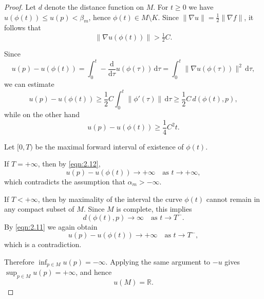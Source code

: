\documentclass[11pt]{amsart}
\theoremstyle{plain}
\theoremstyle{definition}
\theoremstyle{remark}
\numberwithin{equation}{section}
\begin{document}
\begin{proof}
    Let $d$ denote the distance function on $M$.
    For $t \geq 0$ we have $u(\phi(t)) \leq u(p) < \beta_m$, hence $\phi(t) \in M \setminus K$.
    Since $\|\nabla u\| = \frac{1}{2}\|\nabla f\|$, it follows that
    \begin{equation}
        \|\nabla u(\phi(t))\| > \tfrac{1}{2} C.
    \end{equation}

    Since
    \begin{equation}
        u(p) - u(\phi(t)) = \int_0^t -\frac{\mathrm{d}}{\mathrm{d}\tau} u(\phi(\tau)) \, \mathrm{d}\tau = \int_0^t \|\nabla u(\phi(\tau))\|^2 \, \mathrm{d}\tau,
    \end{equation}
    we can estimate
    \begin{equation}\label{eqn:2.11}
        u(p) - u(\phi(t)) \geq \frac{1}{2} C \int_0^t \|\phi'(\tau)\| \, \mathrm{d}\tau \geq \frac{1}{2} C \, d(\phi(t), p),
    \end{equation}
    while on the other hand
    \begin{equation}\label{eqn:2.12}
        u(p) - u(\phi(t)) \geq \frac{1}{4} C^2 t.
    \end{equation}

    Let $[0, T)$ be the maximal forward interval of existence of $\phi(t)$.

    If $T = +\infty$, then by \eqref{eqn:2.12},
    \begin{equation}
        u(p) - u(\phi(t)) \to +\infty \quad \text{as } t \to +\infty,
    \end{equation}
    which contradicts the assumption that $\alpha_m > -\infty$.

    If $T < +\infty$, then by maximality of the interval the curve $\phi(t)$ cannot remain in any compact subset of $M$.
    Since $M$ is complete, this implies
    \begin{equation}
        d(\phi(t), p) \to \infty \quad \text{as } t \to T^-.
    \end{equation}
    By \eqref{eqn:2.11} we again obtain
    \begin{equation}
        u(p) - u(\phi(t)) \to +\infty \quad \text{as } t \to T^-,
    \end{equation}
    which is a contradiction.

    Therefore $\inf_{p \in M} u(p) = -\infty$.
    Applying the same argument to $-u$ gives $\sup_{p \in M} u(p) = +\infty$, and hence
    \begin{equation}
        u(M) = \mathbb{R}.
    \end{equation}


\end{proof}
\end{document}
